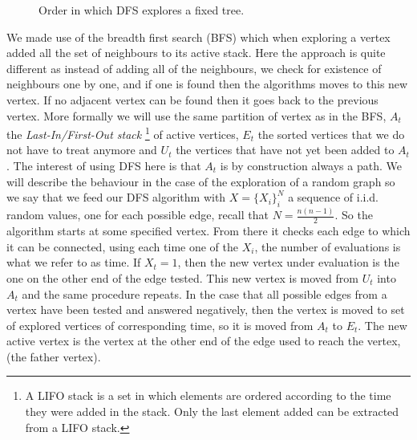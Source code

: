 \begin{figure}[h]
	\centering
	\caption{Order in which DFS explores a fixed tree.}
	\label{fig:DFS}
\end{figure}	
We made use of the breadth first search (BFS) which when exploring a vertex added all the set of neighbours to its active stack.
Here the approach is quite different as instead of adding all of the neighbours, we check for existence of neighbours one by one, and if one is found then the algorithms moves to this new vertex. If no adjacent vertex can be found then it goes back to the previous vertex.
\newline
More formally we will use the same partition of vertex as in the BFS, $A_t$ the \emph{Last-In/First-Out stack}
\footnote{A LIFO stack is a set in which elements are ordered according to the time they were added in the stack. 
Only the last element added can be extracted from a LIFO stack.}
of active vertices, $E_t$ the sorted vertices that we do not have to treat anymore and $U_t$ the vertices that have not yet been added to $A_t$.
The interest of using DFS here is that $A_t$ is by construction always a path.
\newline
We will describe the behaviour in the case of the exploration of a random graph so we say that we feed our DFS algorithm with $X = \{X_i\}_i^N$ a sequence of i.i.d. random values, one for each possible edge, recall that $N = \frac{n(n-1)}{2}$.
So the algorithm starts at some specified vertex. From there it checks each edge to which it can be connected, using each time one of the $X_i$, the number of evaluations is what we refer to as time.
If $X_t = 1$, then the new vertex under evaluation is the one on the other end of the edge tested.
This new vertex is moved from $U_t$ into $A_t$ and the same procedure repeats. 
In the case that all possible edges from a vertex have been tested and answered negatively, then the vertex is moved to set of explored vertices of corresponding time, so it is moved from $A_t$ to $E_t$.
The new active vertex is the vertex at the other end of the edge used to reach the vertex, (the father vertex).
